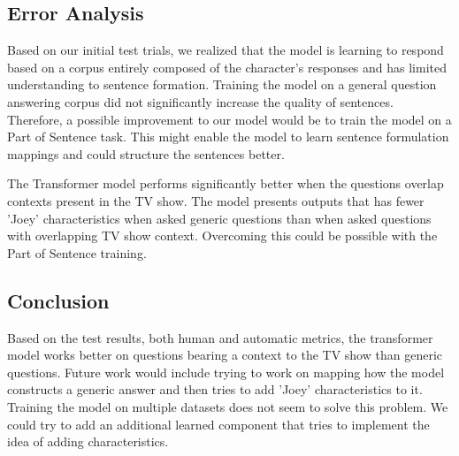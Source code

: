 \subsection{Error Analysis}
Based on our initial test trials, we realized that the model is learning to respond based on a corpus entirely composed of the character's responses and has limited understanding to sentence formation. Training the model on a general question answering corpus did not significantly increase the quality of sentences. Therefore, a possible improvement to our model would be to train the model on a Part of Sentence task. This might enable the model to learn sentence formulation mappings and could structure the sentences better.

The Transformer model performs significantly better when the questions overlap contexts present in the TV show. The model presents outputs that has fewer 'Joey' characteristics when asked generic questions than when asked questions with overlapping TV show context. Overcoming this could be possible with the Part of Sentence training.

\subsection{Conclusion}
Based on the test results, both human and automatic metrics, the transformer model works better on questions bearing a context to the TV show than generic questions. Future work would include trying to work on mapping how the model constructs a generic answer and then tries to add 'Joey' characteristics to it. Training the model on multiple datasets does not seem to solve this problem. We could try to add an additional learned component that tries to implement the idea of adding characteristics.